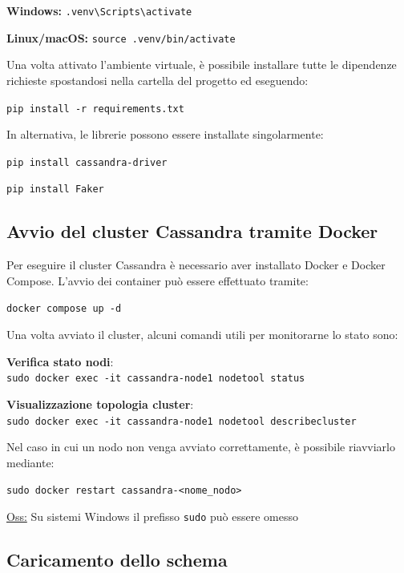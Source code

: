 \documentclass[12pt]{article}
\begin{document}
\textbf{Windows:} \texttt{.venv\textbackslash Scripts\textbackslash activate}

\textbf{Linux/macOS:} \texttt{source .venv/bin/activate}

\vspace{0.5cm}
\noindent
Una volta attivato l'ambiente virtuale, è possibile installare tutte le dipendenze richieste spostandosi nella cartella del progetto ed eseguendo:

\texttt{pip install -r requirements.txt}

\vspace{0.5cm}
\noindent
In alternativa, le librerie possono essere installate singolarmente:

\texttt{pip install cassandra-driver}\newline

\texttt{pip install Faker}

\subsection{Avvio del cluster Cassandra tramite Docker}

Per eseguire il cluster Cassandra è necessario aver installato Docker e Docker Compose.\newline
L'avvio dei container può essere effettuato tramite:

\texttt{docker compose up -d}

\vspace{0.5cm}
\noindent
Una volta avviato il cluster, alcuni comandi utili per monitorarne lo stato sono:

\textbf{Verifica stato nodi}:\\
\hspace*{1cm}\texttt{sudo docker exec -it cassandra-node1 nodetool status}

\textbf{Visualizzazione topologia cluster}:\\
\hspace*{1cm}\texttt{sudo docker exec -it cassandra-node1 nodetool describecluster}

\vspace{0.5cm}
\noindent
Nel caso in cui un nodo non venga avviato correttamente, è possibile riavviarlo mediante:

\texttt{sudo docker restart cassandra-<nome\_nodo>}

\underline{Oss:} Su sistemi Windows il prefisso \texttt{sudo} può essere omesso

\subsection{Caricamento dello schema}
\end{document}
